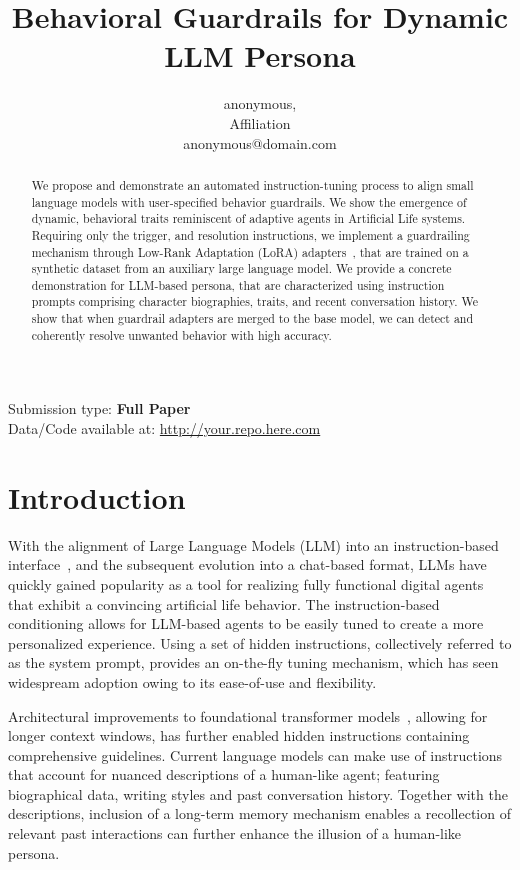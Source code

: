 \documentclass[letterpaper]{article}
\title{Behavioral Guardrails for Dynamic LLM Persona}
\author{
    anonymous, 
    \mbox{}\\
    Affiliation \\ 
    anonymous@domain.com
} %
\begin{document}
\maketitle

\begin{abstract}
    We propose and demonstrate an automated instruction-tuning process to align small language models with user-specified behavior guardrails. We show the emergence of dynamic, behavioral traits reminiscent of adaptive agents in Artificial Life systems.
Requiring only the trigger, and resolution instructions, we implement a guardrailing mechanism through Low-Rank Adaptation (LoRA) adapters~\cite{hu2021lora}, that are trained on a synthetic dataset from an auxiliary large language model. 
We provide a concrete demonstration for LLM-based persona, that are characterized using instruction prompts comprising character biographies, traits, and recent conversation history. We show that when guardrail adapters are merged to the base model, we can detect and coherently resolve unwanted behavior with high accuracy. 
\end{abstract}


Submission type: \textbf{Full Paper}\\

Data/Code available at: \url{http://your.repo.here.com}

\section{Introduction}
With the alignment of Large Language Models (LLM) into an instruction-based interface~\cite{ouyang2022training}, and the subsequent evolution into a chat-based format, LLMs have quickly gained popularity as a tool for realizing fully functional digital agents that exhibit a convincing artificial life behavior.
The instruction-based conditioning allows for LLM-based agents to be easily tuned to create a more personalized experience. Using a set of hidden instructions, collectively referred to as the system prompt, provides an on-the-fly tuning mechanism, which has seen widespream adoption owing to its ease-of-use and flexibility.

Architectural improvements to foundational transformer models~\cite{vaswani2017attention}, allowing for longer context windows, has further enabled hidden instructions containing comprehensive guidelines. Current language models can make use of instructions that account for nuanced descriptions of a human-like agent; featuring biographical data, writing styles and past conversation history. 
Together with the descriptions, inclusion of a long-term memory mechanism enables a recollection of relevant past interactions can further enhance the illusion of a human-like persona.~\cite{ishikawacapturing} 
\end{document}
